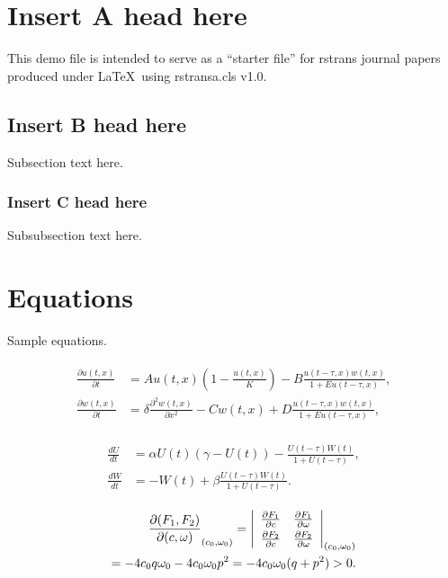 \documentclass[openacc]{rstransa}%
\begin{document}
\begin{fmtext}
\section{Insert A head here}

This demo file is intended to serve as a ``starter file''
for rstrans journal papers produced under \LaTeX\ using
rstransa.cls v1.0.

\subsection{Insert B head here}
Subsection text here.

\subsubsection{Insert C head here}
Subsubsection text here.

\section{Equations}

Sample equations.

\begin{align}\label{1.1}
\begin{split}
\frac{\partial u(t,x)}{\partial t} &= Au(t,x) \left(1-\frac{u(t,x)}{K}\right)-B\frac{u(t-\tau,x) w(t,x)}{1+Eu(t-\tau,x)},\\
\frac{\partial w(t,x)}{\partial t} &=\delta \frac{\partial^2w(t,x)}{\partial x^2}-Cw(t,x)+D\frac{u(t-\tau,x)w(t,x)}{1+Eu(t-\tau,x)},
\end{split}
\end{align}

\begin{align}\label{1.2}
\begin{split}
\frac{dU}{dt} &=\alpha U(t)(\gamma -U(t))-\frac{U(t-\tau)W(t)}{1+U(t-\tau)},\\
\frac{dW}{dt} &=-W(t)+\beta\frac{U(t-\tau)W(t)}{1+U(t-\tau)}.
\end{split}
\end{align}

\begin{eqnarray}
\frac{\partial(F_1,F_2)}{\partial(c,\omega)}_{(c_0,\omega_0)} = \left|
\begin{array}{ll}
\frac{\partial F_1}{\partial c} &\frac{\partial F_1}{\partial \omega} \\\noalign{\vskip3pt}
\frac{\partial F_2}{\partial c}&\frac{\partial F_2}{\partial \omega}
\end{array}\right|_{(c_0,\omega_0)}\notag\\
=-4c_0q\omega_0 -4c_0\omega_0p^2 =-4c_0\omega_0(q+p^2)>0.
\end{eqnarray}
\end{fmtext}
\end{document}
